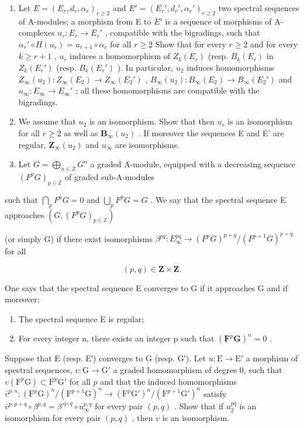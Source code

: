 \begin{enumerate}
\def\labelenumi{\alph{enumi})}
\setcounter{enumi}{1}
\item
  Let \(E = (E_r, d_r, \alpha_r)_{r \geqslant 2}\) and \(E' = (E_r', d_r', \alpha_r')_{r \geqslant 2}\) two spectral sequences of A-modules; a morphism from E to \(E'\) is a sequence of morphisms of A-complexes \(u_r : E_r \to E_r'\) , compatible with the bigradings, such that \(\alpha_r' \circ H(u_r) = u_{r+1} \circ \alpha_r\) for all \(r \geqslant 2\) Show that for every \(r \geqslant 2\) and for every \(k \geqslant r + 1\) , \(u_r\) induces a homomorphism of \(Z_k(E_r)\) (resp. \(B_k(E_r)\) in \(Z_k(E_r')\) (resp. \(B_k(E_r')\) ). In particular, \(u_2\) induces homomorphisms \(Z_\infty(u_2) : Z_\infty(E_2) \to Z_\infty(E_2')\) , \(B_\infty(u_2) : B_\infty(E_2) \to B_\infty(E_2')\) and \(u_\infty : E_\infty \to E_\infty'\) ; all these homomorphisms are compatible with the bigradings.
\item
  We assume that \(u_2\) is an isomorphism. Show that then \(u_r\) is an isomorphism for all \(r \geqslant 2\) as well as \(\mathbf{B}_{\infty}(u_2)\) . If moreover the sequences E and E' are regular, \(\mathbf{Z}_{\infty}(u_2)\) and \(u_{\infty}\) are isomorphisms.
\item
  Let \(G = \bigoplus_{n \in Z} G^n\) a graded A-module, equipped with a decreasing sequence \((F^p G)_{p \in \mathbb{Z}}\) of graded sub-A-modules
\end{enumerate}

such that \(\bigcap_{p} F^{p} G = 0\) and \(\bigcup_{p} F^{p} G = G\) . We say that the spectral sequence E approaches \((G, (F^{p} G)_{p \in \mathbb{Z}})\)

(or simply G) if there exist isomorphisms \(\beta^{pq}: E_{\infty}^{pq} \to (F^p G)^{p+q}/(F^{p+1} G)^{p+q}\) for all

\[
(p, q) \in \mathbf {Z} \times \mathbf {Z}.
\]

One says that the spectral sequence E converges to G if it approaches G and if moreover:

\begin{enumerate}
\def\labelenumi{(\roman{enumi})}
\item
  The spectral sequence E is regular;
\item
  For every integer n, there exists an integer p such that \((\mathbf{F}^{p}\mathbf{G})^{n}=0\) .
\end{enumerate}

Suppose that E (resp. E′) converges to G (resp. G′). Let \(u: \mathrm{E} \to \mathrm{E}'\) a morphism of spectral sequences, \(v: \mathrm{G} \to \mathrm{G}'\) a graded homomorphism of degree 0, such that \(v(\mathrm{F}^p \mathrm{G}) \subset \mathrm{F}^p \mathrm{G}'\) for all \(p\) and that the induced homomorphisms \(\bar{v}^{p,n}: (\mathrm{F}^p \mathrm{G})^n / (\mathrm{F}^{p+1} \mathrm{G})^n \to (\mathrm{F}^p \mathrm{G}')^n / (\mathrm{F}^{p+1} \mathrm{G}')^n\) satisfy \(\bar{v}^{p,p+q} \circ \beta^{p,q} = \beta'^{p,q} \circ u_{\infty}^{p,q}\) for every pair \((p, q)\) . Show that if \(u_2^{pq}\) is an isomorphism for every pair \((p, q)\) , then \(v\) is an isomorphism.


